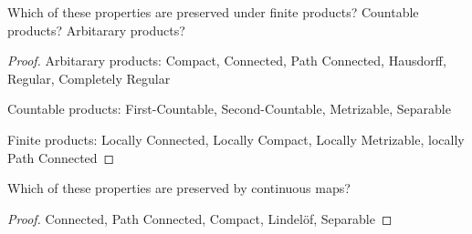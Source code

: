 \documentclass[12pt,a4paper]{article}
\begin{document}
    \begin{ex}
        Which of these properties are preserved under finite products? Countable products? Arbitarary products?
    \end{ex}
    \begin{proof}
        Arbitarary products: Compact, Connected, Path Connected, Hausdorff, Regular, Completely Regular
        
        Countable products: First-Countable, Second-Countable, Metrizable, Separable
        
        Finite products: Locally Connected, Locally Compact, Locally Metrizable, locally Path Connected
    \end{proof}
    \hfill

    \begin{ex}
        Which of these properties are preserved by continuous maps?
    \end{ex}
    \begin{proof}
        Connected, Path Connected, Compact, Lindel\"of, Separable
    \end{proof}

    \printglossary
\end{document}
